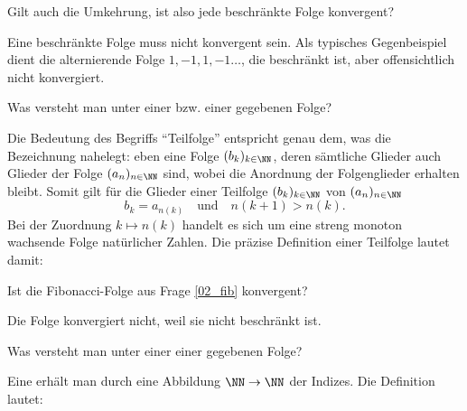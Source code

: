 \begin{frage}
  Gilt auch die Umkehrung, ist also jede beschränkte Folge konvergent?
\end{frage}

\begin{antwort}
  Eine beschränkte Folge muss nicht konvergent sein. Als 
  typisches Gegenbeispiel dient die alternierende Folge 
  $1,-1,1,-1\ldots$, die beschränkt ist, aber offensichtlich  
  nicht konvergiert. 
  \AntEnd
\end{antwort}

\begin{frage}%
  \label{02_tlf}
  Was versteht man unter einer  bzw. einer gegebenen Folge?
\end{frage}

\begin{antwort}
  Die Bedeutung des Begriffs "`Teilfolge"' entspricht genau dem, 
  was die Bezeichnung  nahelegt: 
  eben eine Folge $(b_k)_{k\in\NN}$, deren sämtliche Glieder 
  auch Glieder der Folge $(a_n)_{n\in\NN}$ sind, wobei die 
  Anordnung der Folgenglieder 
  erhalten bleibt. 
  Somit gilt für die Glieder einer Teilfolge $(b_k)_{k\in\NN}$ von 
  $(a_n)_{n\in\NN}$
  \[
  b_k = a_{n(k)} \quad\text{und}\quad n(k+1)>n(k).
  \] 
  Bei der Zuordnung $k\mapsto n(k)$ handelt es sich um eine 
  streng monoton wachsende Folge natürlicher Zahlen. Die präzise 
  Definition einer Teilfolge lautet damit: 
  \AntEnd
\end{antwort}



\begin{frage}%
  \label{02_fibk}
  Ist die Fibonacci-Folge aus Frage \ref{02_fib} konvergent?
\end{frage}

\begin{antwort}
  Die Folge konvergiert nicht, weil sie nicht beschränkt ist. 
  \AntEnd 
\end{antwort}

\begin{frage}
  Was versteht man unter einer  einer gegebenen Folge?
\end{frage}

\begin{antwort}
  Eine  erhält man  
  durch eine  Abbildung $\NN\to\NN$ 
  der Indizes. Die Definition lautet: 
  \AntEnd
\end{antwort}

